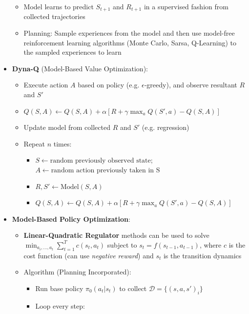 \documentclass{article}
\providecommand{\tightlist}{%
  \setlength{\itemsep}{\GlobalItemSep}\setlength{\parskip}{\GlobalListParSkip}}
\newlength{\GlobalItemSep}
\newlength{\GlobalListParSkip}
\begin{document}
\begin{multicols}{2}
\begin{itemize}
  \begin{itemize}
  \tightlist
  \item
    Model learns to predict \(S_{t+1}\) and \(R_{t+1}\) in a supervised
    fashion from collected trajectories
  \item
    Planning: Sample experiences from the model and then use model-free
    reinforcement learning algorithms (Monte Carlo, Sarsa, Q-Learning)
    to the sampled experiences to learn
  \end{itemize}
\item
  \textbf{Dyna-Q} (Model-Based Value Optimization):

  \begin{itemize}
  \tightlist
  \item
    Execute action \(A\) based on policy (e.g. \(\epsilon\)-greedy), and
    observe resultant \(R\) and \(S'\)
  \item
    \(Q(S,A) \leftarrow Q(S,A) + \alpha [R + \gamma \max_a Q(S', a) - Q(S, A)]\)
  \item
    Update model from collected \(R\) and \(S'\) (e.g. regression)
  \item
    Repeat \(n\) times:

    \begin{itemize}
    \tightlist
    \item
      \(S \leftarrow \text{random previously observed state}\);
      \(A \leftarrow \text{random action previously taken in S}\)
    \item
      \(R, S' \leftarrow \text{Model}(S,A)\)
    \item
      \(Q(S,A) \leftarrow Q(S,A) + \alpha [R + \gamma \max_a Q(S' ,a) - Q(S,A)]\)
    \end{itemize}
  \end{itemize}
\item
  \textbf{Model-Based Policy Optimization}:

  \begin{itemize}
  \tightlist
  \item
    \textbf{Linear-Quadratic Regulator} methods can be used to solve
    \(\min_{a_i, ..., a_t}\sum_{t=1}^T c(s_t, a_t)\) subject to
    \(s_t = f(s_{t-1}, a_{t-1})\), where \(c\) is the cost function (can
    use \emph{negative reward}) and \(s_t\) is the transition dynamics
  \item
    Algorithm (Planning Incorporated):

    \begin{itemize}
    \tightlist
    \item
      Run base policy \(\pi_0(a_t | s_t)\) to collect
      \(\mathcal{D} = \{(s, a, s')_i\}\)
    \item
      Loop every step:


\end{itemize}
\end{itemize}
\end{itemize}
\end{multicols}
\end{document}
